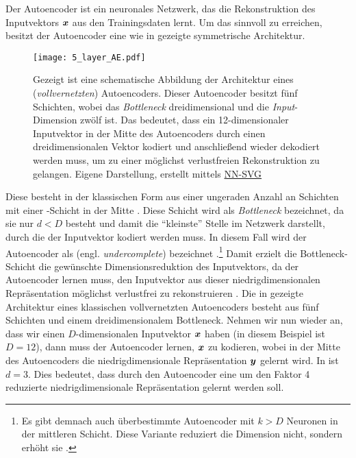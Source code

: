 Der Autoencoder ist ein neuronales Netzwerk, das die Rekonstruktion des Inputvektors $\bm{x}$ aus
den Trainingsdaten lernt. Um das sinnvoll zu erreichen, besitzt der Autoencoder eine wie in
 gezeigte symmetrische Architektur. 
\begin{figure}[ht]
	\label{fig:5-layer-Autoencoder}
	\begin{center}
		\texttt{[image: 5\_layer\_AE.pdf]}
		\caption[Schematische Abbildung der Architektur eines Autoencoders]{Gezeigt ist eine schematische Abbildung der Architektur eines (\textit{vollvernetzten}) Autoencoders. Dieser Autoencoder besitzt fünf Schichten, wobei das \textit{Bottleneck} dreidimensional und die \textit{Input}-Dimension zwölf ist. Das bedeutet, dass ein 12-dimensionaler Inputvektor in der Mitte des Autoencoders durch einen dreidimensionalen Vektor kodiert und anschließend wieder dekodiert werden muss, um zu einer möglichst verlustfreien Rekonstruktion zu gelangen. Eigene Darstellung, erstellt mittels \href{https://alexlenail.me/NN-SVG/}{NN-SVG}}
	\end{center}
\end{figure}
Diese besteht in der
klassischen Form aus einer ungeraden Anzahl an Schichten mit einer -Schicht in
der Mitte \parencite[2]{Bank.2020}. Diese Schicht wird als \textit{Bottleneck} bezeichnet, da sie nur $d < D$
besteht und damit die \enquote{kleinste} Stelle im Netzwerk darstellt, durch die der Inputvektor
kodiert werden muss. In diesem Fall wird der Autoencoder als  (engl.
\textit{undercomplete}) bezeichnet \parencite[503]{Goodfellow.2016}.\footnote{Es gibt demnach auch überbestimmte Autoencoder mit $k > D$
	Neuronen in der mittleren Schicht. Diese Variante reduziert die Dimension nicht, sondern erhöht sie \parencite[504]{Goodfellow.2016}.} Damit erzielt die Bottleneck-Schicht die gewünschte
Dimensionsreduktion des Inputvektors, da der Autoencoder lernen muss, den Inputvektor aus dieser
niedrigdimensionalen Repräsentation möglichst verlustfrei zu rekonstruieren \parencites[502]{Goodfellow.2016}[2]{Bank.2020}. Die in  gezeigte
Architektur eines klassischen vollvernetzten Autoencoders besteht aus fünf Schichten und einem
dreidimensionalem Bottleneck. Nehmen wir nun wieder an, dass wir einen $D$-dimensionalen
Inputvektor $\bm{x}$ haben (in diesem Beispiel ist $D = 12$), dann muss der Autoencoder lernen,
$\bm{x}$ zu kodieren, wobei in der Mitte des Autoencoders die niedrigdimensionale Repräsentation
$\bm{y}$ gelernt wird. In  ist $d = 3$. Dies bedeutet, dass
durch den Autoencoder eine um den Faktor 4 reduzierte niedrigdimensionale Repräsentation gelernt
werden soll.

